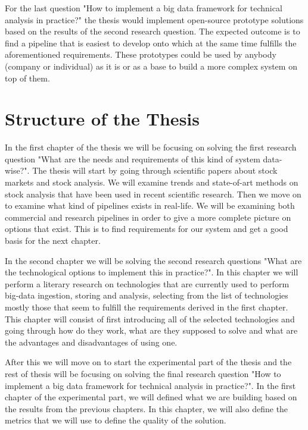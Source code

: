 For the last question "How to implement a big data framework for technical analysis in practice?" the thesis would implement open-source prototype solutions based on the results of the second research question.
The expected outcome is to find a pipeline that is easiest to develop onto which at the same time fulfills the aforementioned requirements.
These prototypes could be used by anybody (company or individual) as it is or as a base to build a more complex system on top of them.

\section{Structure of the Thesis}

In the first chapter of the thesis we will be focusing on solving the first research question "What are the needs and requirements of this kind of system data-wise?".
The thesis will start by going through scientific papers about stock markets and stock analysis.
We will examine trends and state-of-art methods on stock analysis that have been used in recent scientific research.
Then we move on to examine what kind of pipelines exists in real-life.
We will be examining both commercial and research pipelines in order to give a more complete picture on options that exist.
This is to find requirements for our system and get a good basis for the next chapter.

In the second chapter we will be solving the second research questions "What are the technological options to implement this in practice?".
In this chapter we will perform a literary research on technologies that are currently used to perform big-data ingestion, storing and analysis, selecting from the list of technologies mostly those that seem to fulfill the requirements derived in the first chapter.
This chapter will consist of first introducing all of the selected technologies and going through how do they work, what are they supposed to solve and what are the advantages and disadvantages of using one.

After this we will move on to start the experimental part of the thesis and the rest of thesis will be focusing on solving the final research question "How to implement a big data framework for technical analysis in practice?".
In the first chapter of the experimental part, we will defined what we are building based on the results from the previous chapters.
In this chapter, we will also define the metrics that we will use to define the quality of the solution.

